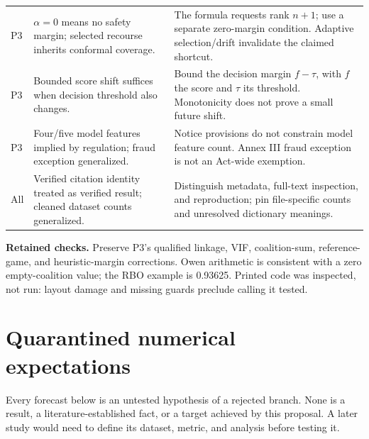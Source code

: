 \documentclass[11pt,a4paper]{article}
\newcommand{\pbreak}{\clearpage}
\newcommand{\lead}[1]{\textbf{\color{navy}#1}}
\newcommand{\status}[1]{\textsf{\color{teal}#1}}
\begin{document}
\begin{table}[H]
\begin{tabularx}{\linewidth}{p{.14\linewidth}YY}
P3 & $\alpha=0$ means no safety margin; selected recourse inherits conformal coverage. & The formula requests rank $n+1$; use a separate zero-margin condition. Adaptive selection/drift invalidate the claimed shortcut.\\
P3 & Bounded score shift suffices when decision threshold also changes. & Bound the decision margin $f-\tau$, with $f$ the score and $\tau$ its threshold. Monotonicity does not prove a small future shift.\\
P3 & Four/five model features implied by regulation; fraud exception generalized. & Notice provisions do not constrain model feature count. Annex III fraud exception is not an Act-wide exemption.\\
All & Verified citation identity treated as verified result; cleaned dataset counts generalized. & Distinguish metadata, full-text inspection, and reproduction; pin file-specific counts and unresolved dictionary meanings.\\\bottomrule
\end{tabularx}\end{table}

\lead{Retained checks.} Preserve P3's qualified linkage, VIF, coalition-sum, reference-game, and heuristic-margin corrections. Owen arithmetic is consistent with a zero empty-coalition value; the RBO example is 0.93625. Printed code was inspected, not run: layout damage and missing guards preclude calling it tested.

\pbreak
\section{Quarantined numerical expectations}
Every forecast below is an \status{untested hypothesis of a rejected branch}. None is a result, a literature-established fact, or a target achieved by this proposal. A later study would need to define its dataset, metric, and analysis before testing it.
\end{document}
